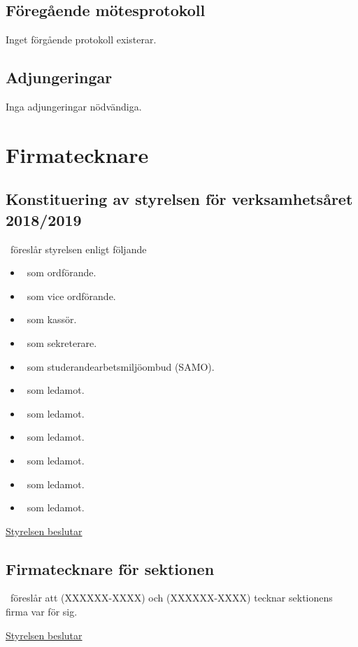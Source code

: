 \documentclass{dTeX-minutes}
\begin{document}
  \subsection{Föregående mötesprotokoll}
     Inget förgående protokoll existerar.
  \subsection{Adjungeringar}
     Inga adjungeringar nödvändiga.

  \section{Firmatecknare}
  \subsection{Konstituering av styrelsen för verksamhetsåret 2018/2019}
    \ordf\ föreslår styrelsen enligt följande
    \begin{itemize}
      \item \ordf~som ordförande.
      \item \vice~som vice ordförande.
      \item \kass~som kassör.
      \item \sekr~som sekreterare.
      \item \samo~som studerandearbetsmiljöombud (SAMO).
      \item \nollkordf~som ledamot.
      \item \deltaordf~som ledamot.
      \item \sexordf~som ledamot.
      \item \rustordf~som ledamot.
      \item \dagordf~som ledamot.
      \item \dnsordf~som ledamot.
    \end{itemize}

    \underline{Styrelsen beslutar}\\

  \subsection{Firmatecknare för sektionen}
    \ordf\ föreslår att \ordf(XXXXXX-XXXX) och \kass(XXXXXX-XXXX) tecknar sektionens firma var för sig.

    \underline{Styrelsen beslutar}\\
\end{document}
